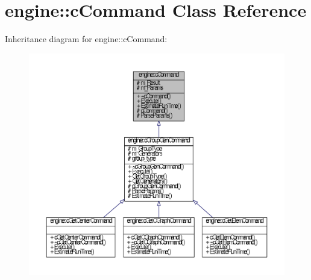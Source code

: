 \hypertarget{classengine_1_1cCommand}{\section{engine\-:\-:c\-Command \-Class \-Reference}
\label{classengine_1_1cCommand}
}


\-Inheritance diagram for engine\-:\-:c\-Command\-:\nopagebreak
\begin{figure}[H]
\begin{center}
\leavevmode
\includegraphics[width=350pt]{classengine_1_1cCommand__inherit__graph}
\end{center}
\end{figure}


